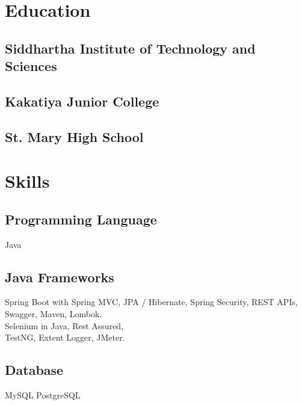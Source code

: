 \documentclass[]{deedy-resume-openfont}
\begin{document}
\begin{minipage}[t]{0.33\textwidth}
\section{Education} 

\subsection{Siddhartha Institute of \newline Technology and Sciences}
\sectionsep

\subsection{Kakatiya Junior College}
\sectionsep

\subsection{St. Mary High School}
\sectionsep


\section{Skills}
\subsection{Programming Language}
\textbullet{} Java  \\ 
\sectionsep

\subsection{Java Frameworks}
\textbullet{} Spring Boot with Spring MVC, 
JPA / Hibernate, 
Spring Security, REST APIs, Swagger, Maven, Lombok. \\ 
\textbullet{} Selenium in Java,  Rest Assured, \\ TestNG, Extent Logger, JMeter.
\sectionsep


\subsection{Database}
\textbullet{} MySQL 
\textbullet{} PostgreSQL
\sectionsep


\end{minipage}
\end{document}
